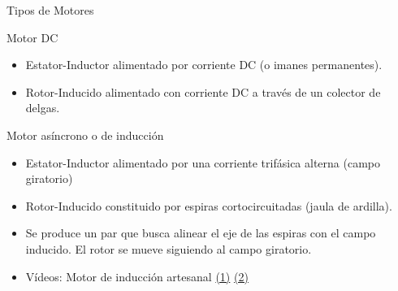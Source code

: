\documentclass[xcolor={usenames,svgnames,dvipsnames}]{beamer}
\begin{document}
\begin{frame}[label={sec:org1cf56d7}]{Tipos de Motores}
\begin{block}{Motor DC}
\begin{itemize}
\item Estator-Inductor alimentado por corriente DC (o imanes permanentes).

\item Rotor-Inducido alimentado con corriente DC a través de un colector de delgas.
\end{itemize}
\end{block}

\begin{block}{Motor asíncrono o de inducción}
\begin{itemize}
\item Estator-Inductor alimentado por una corriente trifásica alterna (campo giratorio)

\item Rotor-Inducido constituido por espiras cortocircuitadas (jaula de
ardilla).

\item Se produce un par que busca alinear el eje de las espiras con el
campo inducido. El rotor se mueve siguiendo al campo giratorio.

\item Vídeos: Motor de inducción artesanal \href{http://www.youtube.com/watch?v=ZRGlAu0uCHY\&feature=related}{(1)} \href{http://www.youtube.com/watch?v=P-eTLmJC2cQ}{(2)}
\end{itemize}
\end{block}
\end{frame}
\end{document}
